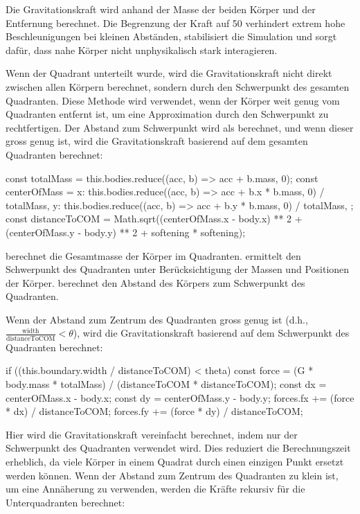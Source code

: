 \documentclass[a4paper,12pt,twoside]{article}
\begin{document}
Die Gravitationskraft  wird anhand der Masse der beiden Körper und der Entfernung berechnet.
Die Begrenzung der Kraft auf 50 verhindert extrem hohe Beschleunigungen bei kleinen Abständen, stabilisiert die Simulation und sorgt dafür, dass nahe Körper nicht 
unphysikalisch stark interagieren.


Wenn der Quadrant unterteilt wurde, wird die Gravitationskraft nicht direkt zwischen allen Körpern berechnet, sondern durch den Schwerpunkt des gesamten Quadranten. Diese Methode wird verwendet, wenn der Körper weit genug vom Quadranten entfernt ist, um eine Approximation durch den Schwerpunkt zu rechtfertigen. Der Abstand zum Schwerpunkt wird als  berechnet, und wenn dieser gross genug ist, wird die Gravitationskraft basierend auf dem gesamten Quadranten berechnet:

\begin{javascript}
const totalMass = this.bodies.reduce((acc, b) => acc + b.mass, 0);
const centerOfMass = {
  x: this.bodies.reduce((acc, b) => acc + b.x * b.mass, 0) / totalMass,
  y: this.bodies.reduce((acc, b) => acc + b.y * b.mass, 0) / totalMass,
};
const distanceToCOM = Math.sqrt((centerOfMass.x - body.x) ** 2 + (centerOfMass.y - body.y) ** 2 + softening * softening);
\end{javascript}

 berechnet die Gesamtmasse der Körper im Quadranten.
 ermittelt den Schwerpunkt des Quadranten unter Berücksichtigung der Massen und Positionen der Körper.
 berechnet den Abstand des Körpers zum Schwerpunkt des Quadranten.

Wenn der Abstand zum Zentrum des Quadranten gross genug ist (d.h., \( \frac{\text{width}}{\text{distanceToCOM}} < \theta \)), wird die Gravitationskraft basierend auf dem Schwerpunkt des Quadranten berechnet:

\begin{javascript}
if ((this.boundary.width / distanceToCOM) < theta) {
    const force = (G * body.mass * totalMass) / (distanceToCOM * distanceToCOM);
    const dx = centerOfMass.x - body.x;
    const dy = centerOfMass.y - body.y;
    forces.fx += (force * dx) / distanceToCOM;
    forces.fy += (force * dy) / distanceToCOM;
}
\end{javascript}

Hier wird die Gravitationskraft vereinfacht berechnet, indem nur der Schwerpunkt des Quadranten verwendet wird. Dies reduziert die Berechnungszeit erheblich, da viele Körper in einem Quadrat durch einen einzigen Punkt ersetzt werden können.
Wenn der Abstand zum Zentrum des Quadranten zu klein ist, um eine Annäherung zu verwenden, werden die Kräfte rekursiv für die Unterquadranten berechnet:
\end{document}
